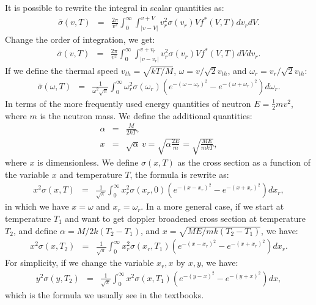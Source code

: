 \noindent It is possible to rewrite the integral in scalar quantities as:
\begin{eqnarray}
\bar{\sigma}(v,T)&=&\frac{2\pi}{v^2}\int_0^{\infty}\int_{|v-V|}^{v+V}v_r^2\sigma(v_r)Vf^{*}(V,T)dv_rdV.
\end{eqnarray}
\noindent Change the order of integration, we get:
\begin{eqnarray}
\bar{\sigma}(v,T)&=&\frac{2\pi}{v^2}\int_0^{\infty}\int_{|v-v_r|}^{v+v_r}v_r^2\sigma(v_r)Vf^{*}(V,T)dVdv_r.
\end{eqnarray}
\noindent If we define the thermal speed $v_{th}=\sqrt{kT/M}$, $\omega=v/\sqrt{2}v_{th}$, and $\omega_r=v_r/\sqrt{2}v_{th}$:
\begin{eqnarray}
\bar{\sigma}(\omega,T)&=&\frac{1}{\omega^2\sqrt{\pi}}\int_0^{\infty}\omega_r^2\sigma(\omega_r)\left(e^{-(\omega-\omega_r)^2}-e^{-(\omega+\omega_r)^2}\right)d\omega_r.
\end{eqnarray}
\noindent In terms of the more frequently used energy quantities of neutron $E=\frac{1}{2}mv^2$, where $m$ is the neutron mass. We define the additional quantities:
\begin{eqnarray}
\alpha &=& \frac{M}{2kT},\\
x &=& \sqrt{\alpha}\,v = \sqrt{\alpha \frac{2E}{m}}=\sqrt{\frac{ME}{mkT}},
\end{eqnarray}
where $x$ is dimensionless. We define $\sigma(x,T)$ as the cross section as a function of the variable $x$ and temperature $T$, the formula is rewrite as:
\begin{eqnarray}
x^2\sigma(x,T) &=& \frac{1}{\sqrt{\pi}}\int_{0}^{\infty}x_r^2\sigma(x_r,0)\left(e^{-(x-x_r)^2}-e^{-(x+x_r)^2}\right)dx_r,
\end{eqnarray}
in which we have $x=\omega$ and $x_r=\omega_r$. In a more general case, if we start at temperature $T_1$ and want to get doppler broadened cross section at temperature $T_2$, and define $\alpha=M/2k(T_2-T_1)$, and $x=\sqrt{ME/mk(T_2-T_1)}$, we have:
\begin{eqnarray}
x^2\sigma(x,T_2) &=& \frac{1}{\sqrt{\pi}}\int_{0}^{\infty}x_r^2\sigma(x_r,T_1)\left(e^{-(x-x_r)^2}-e^{-(x+x_r)^2}\right)dx_r.
\end{eqnarray}
For simplicity, if we change the variable $x_r,x$ by $x,y$, we have:
\begin{eqnarray}
y^2\sigma(y,T_2) &=& \frac{1}{\sqrt{\pi}}\int_{0}^{\infty}x^2\sigma(x,T_1)\left(e^{-(y-x)^2}-e^{-(y+x)^2}\right)dx,
\end{eqnarray}
which is the formula we usually see in the textbooks.

